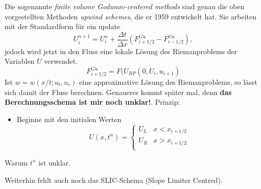 Die sogenannte {\it finite volume Godunov-centered methods} sind genau
die oben vorgestellten Methoden {\it upwind schemes}, die er 1959
entwickelt hat. Sie arbeiten mit der Standardform für ein update
\begin{equation}
U_i^{n+1} = U_i^n + \frac{\Delta t}{\Delta x}\left(F^{Gu}_{i+1/2} -
F^{Gu}_{i-1/2}\right),
\end{equation}
jedoch wird jetzt in den Fluss eine lokale Lösung des Riemanproblems
der Variablen $U$ verwendet.
\[
F^{Gu}_{i+1/2} = F (U_{RP}(0,U_i,u_{i+1})
\]
Ist $w=w(x/t;u_l,u_r)$ eine approximative Lösung des Riemanproblems,
so lässt sich damit der Fluss berechnen. Genaueres kommt später mal,
denn {\bf das Berechnungsschema ist mir noch unklar!}. Prinzip:
\begin{itemize}
\item Beginne mit den initialen Werten
\begin{equation}
U(x,t^n) = \left\{ 
\begin{array}{ll}
U_L & x < x_{i+1/2}\\
U_R & x > x_{i+1/2}\\
\end{array}
\right.
\end{equation}
\end{itemize}
Warum $t^n$ ist unklar.

Weiterhin fehlt auch noch das SLIC-Schema (Slope Limiter Centred).
